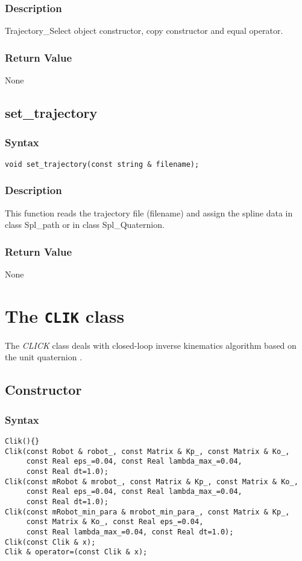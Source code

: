 \documentclass[11pt,fleqn,letterpaper]{report}
\begin{document}
\subsubsection*{Description}   
Trajectory\_Select object constructor, copy constructor and equal operator.

\subsubsection*{Return Value}

None

\newpage

\subsection*{set\_trajectory}
\subsubsection*{Syntax}
\begin{verbatim}
void set_trajectory(const string & filename);
\end{verbatim}

\subsubsection*{Description}   
This function reads the trajectory file (filename) and 
assign the spline data in class Spl\_path or in class
Spl\_Quaternion.

\subsubsection*{Return Value}

None

\newpage

\section{The \texttt{CLIK} class}

The \emph{CLICK} class deals with closed-loop inverse kinematics
algorithm based on the unit quaternion \cite{Chiaverini99}.

\subsection*{Constructor}
\subsubsection*{Syntax}
\begin{verbatim}
Clik(){}
Clik(const Robot & robot_, const Matrix & Kp_, const Matrix & Ko_, 
     const Real eps_=0.04, const Real lambda_max_=0.04, 
     const Real dt=1.0);
Clik(const mRobot & mrobot_, const Matrix & Kp_, const Matrix & Ko_, 
     const Real eps_=0.04, const Real lambda_max_=0.04, 
     const Real dt=1.0);
Clik(const mRobot_min_para & mrobot_min_para_, const Matrix & Kp_, 
     const Matrix & Ko_, const Real eps_=0.04, 
     const Real lambda_max_=0.04, const Real dt=1.0);
Clik(const Clik & x);
Clik & operator=(const Clik & x);
\end{verbatim}
\end{document}
